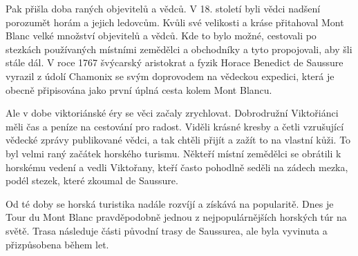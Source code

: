 Pak přišla doba raných objevitelů a vědců. V 18. století byli vědci nadšení porozumět horám a jejich ledovcům. Kvůli své velikosti a kráse přitahoval Mont Blanc velké množství objevitelů a vědců. Kde to bylo možné, cestovali po stezkách používaných místními zemědělci a obchodníky a tyto propojovali, aby šli stále dál. V roce 1767 švýcarský aristokrat a fyzik Horace Benedict de Saussure vyrazil z údolí Chamonix se svým doprovodem na vědeckou expedici, která je obecně připisována jako první úplná cesta kolem Mont Blancu.

Ale v dobe viktoriánské éry se věci začaly zrychlovat. Dobrodružní Viktořiánci měli čas a peníze na cestování pro radost. Viděli krásné kresby a četli vzrušující vědecké zprávy publikované vědci, a tak chtěli přijít a zažít to na vlastní kůži. To byl velmi raný začátek horského turismu. Někteří místní zemědělci se obrátili k horskému vedení a vedli Viktořany, kteří často pohodlně seděli na zádech mezka, podél stezek, které zkoumal de Saussure.

Od té doby se horská turistika nadále rozvíjí a získává na popularitě. Dnes je Tour du Mont Blanc pravděpodobně jednou z nejpopulárnějších horských túr na světě. Trasa následuje části původní trasy de Saussurea, ale byla vyvinuta a přizpůsobena během let.

